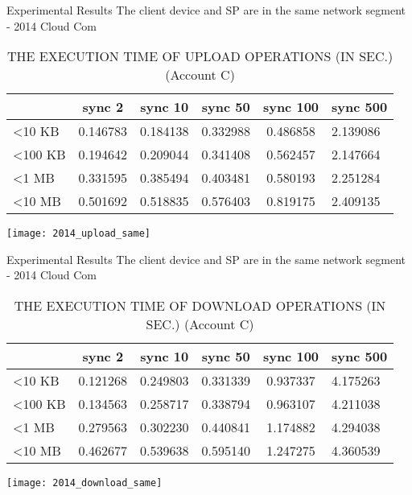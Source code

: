 \begin{frame}{Experimental Results}
{The client device and SP are in the same network segment - 2014 Cloud Com}
	\scriptsize
    \begin{table}[]
    \centering
    \caption{THE EXECUTION TIME OF \alert{UPLOAD} OPERATIONS (IN SEC.) (Account C)}
    \begin{tabular}{lccccl}
                         & sync 2   & sync 10  & sync 50  & sync 100 & sync 500 \\ \hline
        \textless 10 KB  & 0.146783 & 0.184138 & 0.332988 & 0.486858 & 2.139086  \\ \hline
        \textless 100 KB & 0.194642 & 0.209044 & 0.341408 & 0.562457 & 2.147664  \\ \hline
        \textless 1 MB   & 0.331595 & 0.385494 & 0.403481 & 0.580193 & 2.251284  \\ \hline
        \textless 10 MB  & 0.501692 & 0.518835 & 0.576403 & 0.819175 & 2.409135  \\ \hline
    \end{tabular}
    \end{table}
    \begin{center}
		\texttt{[image: 2014\_upload\_same]}
    \end{center}
\end{frame}

\begin{frame}{Experimental Results}
{The client device and SP are in the same network segment - 2014 Cloud Com}
	\scriptsize
    \begin{table}[]
    \centering
    \caption{THE EXECUTION TIME OF \alert{DOWNLOAD} OPERATIONS (IN SEC.) (Account C)}
    \begin{tabular}{lccccl}
                         & sync 2   & sync 10  & sync 50  & sync 100 & sync 500  \\ \hline
        \textless 10 KB  & 0.121268 & 0.249803 & 0.331339 & 0.937337 & 4.175263  \\ \hline
        \textless 100 KB & 0.134563 & 0.258717 & 0.338794 & 0.963107 & 4.211038  \\ \hline
        \textless 1 MB   & 0.279563 & 0.302230 & 0.440841 & 1.174882 & 4.294038  \\ \hline
        \textless 10 MB  & 0.462677 & 0.539638 & 0.595140 & 1.247275 & 4.360539  \\ \hline
    \end{tabular}
    \end{table}
    \begin{center}
		\texttt{[image: 2014\_download\_same]}
    \end{center}
\end{frame}

